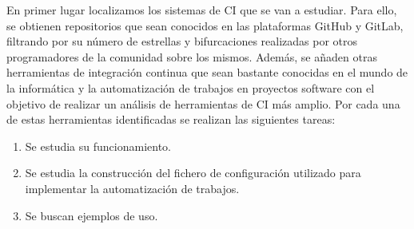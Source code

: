 En primer lugar localizamos los sistemas de CI que se van a estudiar. Para ello, se obtienen repositorios que sean conocidos en las plataformas GitHub y GitLab, filtrando por su número de estrellas y bifurcaciones realizadas por otros programadores de la comunidad sobre los mismos. Además, se añaden otras herramientas de integración continua que sean bastante conocidas en el mundo de la informática y la automatización de trabajos en proyectos software con el objetivo de realizar un análisis de herramientas de CI más amplio.
Por cada una de estas herramientas identificadas se realizan las siguientes tareas:
\begin{enumerate}
    \item Se estudia su funcionamiento.
    \item Se estudia la construcción del fichero de configuración utilizado para implementar la automatización de trabajos.
    \item Se buscan ejemplos de uso.
\end{enumerate}

